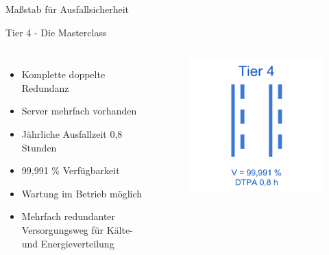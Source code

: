 \documentclass[10pt]{beamer}
\begin{document}
\begin{frame}[fragile]{Maßstab für Ausfallsicherheit}
\begin{alertblock}{Tier 4 - Die Masterclass}
\end{alertblock}
\begin{columns}[T,c,onlytextwidth]
	\begin{itemize}
		\item Komplette doppelte Redundanz
		\item Server mehrfach vorhanden
		\item Jährliche Ausfallzeit 0,8 Stunden
		\item 99,991 \% Verfügbarkeit
		\item Wartung im Betrieb möglich
		\item Mehrfach redundanter Versorgungsweg für Kälte- und Energieverteilung
	\end{itemize}
	\begin{figure}
		\includegraphics[width=1\textwidth]{images/tier4}
	\end{figure}
\end{columns}
\end{frame}
\end{document}
